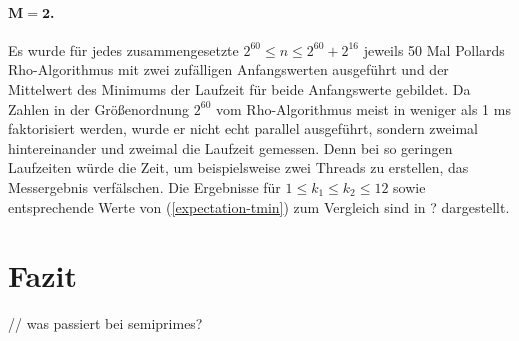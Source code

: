 \documentclass[a4paper, 10pt, ngerman]{article}
\begin{document}
\paragraph{$\pmb{M = 2}$.} Es wurde für jedes zusammengesetzte $2^{60} \le n \le 2^{60} + 2^{16}$ jeweils 50 Mal Pollards Rho-Algorithmus mit zwei zufälligen Anfangswerten ausgeführt und der Mittelwert des Minimums der Laufzeit für beide Anfangswerte gebildet. Da Zahlen in der Größenordnung $2^{60}$ vom Rho-Algorithmus meist in weniger als 1 ms faktorisiert werden, wurde er nicht echt parallel ausgeführt, sondern zweimal hintereinander und zweimal die Laufzeit gemessen. Denn bei so geringen Laufzeiten würde die Zeit, um beispielsweise zwei Threads zu erstellen, das Messergebnis verfälschen. Die Ergebnisse für $1 \le k_1 \le k_2 \le 12$ sowie entsprechende Werte von (\ref{expectation-tmin}) zum Vergleich sind in ? dargestellt.

\section{Fazit}

// was passiert bei semiprimes?

\printbibliography
\end{document}
